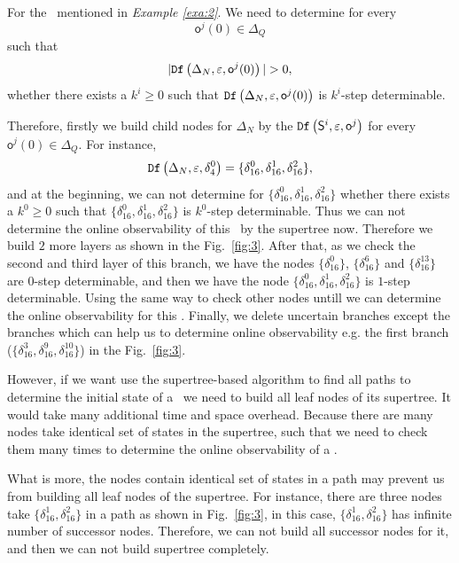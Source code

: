 \begin{example}
For the \BCN\ mentioned in {\em Example \ref{exa:2}}. We need to determine for every \[\mathsf{o}^{j}(0)\in \Delta_Q\] such that \[|\Ded\left(\Delta_N,\varepsilon, \mathsf{o}^{j}(0)\right)|> 0,\] whether there exists a $k^{i}\ge0$ such that ${\tt Df}\left(\Delta_N,\varepsilon,\mathsf{o}^{j}(0)\right)$ is $k^{i}$-step determinable.

Therefore, firstly we build child nodes for $\Delta_N$ by the ${\tt Df}\left(\mathsf{S}^i,\varepsilon, \mathsf{o}^j\right)$ for every $\mathsf{o}^{j}(0)\in \Delta_Q$. For instance, \[{\tt Df}\left(\Delta_N,\varepsilon,\delta_{4}^0\right)=\{\delta_{16}^0,\delta_{16}^1,\delta_{16}^2\},\] and at the beginning, we can not determine for $\{\delta_{16}^0,\delta_{16}^1,\delta_{16}^2\}$ whether there exists a $k^{0}\ge0$ such that $\{\delta_{16}^0,\delta_{16}^1,\delta_{16}^2\}$ is $k^{0}$-step determinable. Thus we can not determine the online observability of this \BCN\ by the supertree now. Therefore we build $2$ more layers as shown in the Fig.~\ref{fig:3}. After that, as we check the second and third layer of this branch, we have the nodes $\{\delta_{16}^0\}$, $\{\delta_{16}^6\}$ and $\{\delta_{16}^{13}\}$ are $0$-step determinable, and then we have the node $\{\delta_{16}^0,\delta_{16}^1,\delta_{16}^2\}$ is $1$-step determinable. Using the same way to check other nodes untill we can determine the online observability for this \BCN. Finally, we delete uncertain branches except the branches which can help us to determine online observability e.g. the first branch ($\{\delta_{16}^{3},\delta_{16}^{9},\delta_{16}^{10}\}$) in the Fig.~\ref{fig:3}. 
\label{exa:11}
\end{example}   

However, if we want use the supertree-based algorithm to find all paths to determine the initial state of a \BCN\ we need to build all leaf nodes of its supertree. It would take many additional time and space overhead. Because 
 there are many nodes take identical set of states in the supertree, such that we need to check them many times to determine the online observability of a \BCN. 
 
 What is more, the nodes contain identical set of states in a path may prevent us from building all leaf nodes of the supertree. For instance, there are three nodes take $\{\delta_{16}^1,\delta_{16}^2\}$ in a path as shown in Fig.~\ref{fig:3}, in this case, $\{\delta_{16}^1,\delta_{16}^2\}$ has infinite number of successor nodes. Therefore, we can not build all successor nodes for it, and then we can not build supertree completely.

